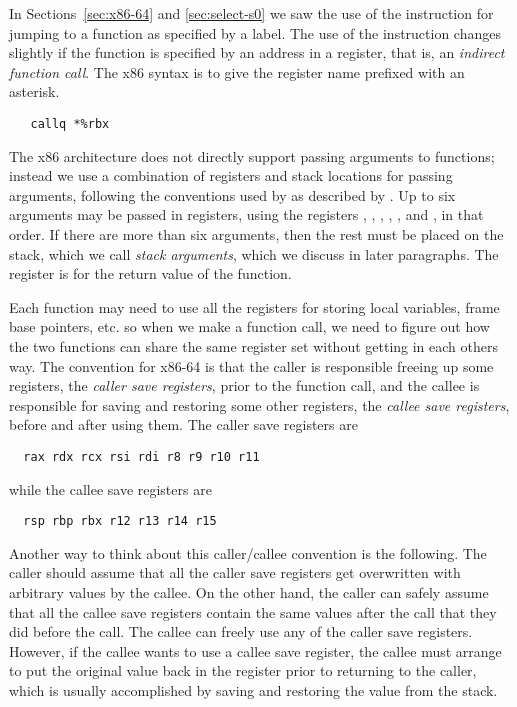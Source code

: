 \documentclass[11pt]{book}
\begin{document}
In Sections~\ref{sec:x86-64} and \ref{sec:select-s0} we saw the use of
the  instruction for jumping to a function as specified by
a label. The use of the instruction changes slightly if the function
is specified by an address in a register, that is, an \emph{indirect
  function call}. The x86 syntax is to give the register name prefixed
with an asterisk.
\begin{lstlisting}
   callq *%rbx
\end{lstlisting}

The x86 architecture does not directly support passing arguments to
functions; instead we use a combination of registers and stack
locations for passing arguments, following the conventions used by
 as described by \cite{Matz:2013aa}. Up to six arguments may
be passed in registers, using the registers , ,
, , , and , in that order.  If
there are more than six arguments, then the rest must be placed on the
stack, which we call \emph{stack arguments}, which we discuss in later
paragraphs. The register  is for the return value of the
function.

Each function may need to use all the registers for storing local
variables, frame base pointers, etc. so when we make a function call,
we need to figure out how the two functions can share the same
register set without getting in each others way. The convention for
x86-64 is that the caller is responsible freeing up some registers,
the \emph{caller save registers}, prior to the function call, and the
callee is responsible for saving and restoring some other registers,
the \emph{callee save registers}, before and after using them. The
caller save registers are
\begin{lstlisting}
  rax rdx rcx rsi rdi r8 r9 r10 r11
\end{lstlisting}
while the callee save registers are 
\begin{lstlisting}
  rsp rbp rbx r12 r13 r14 r15
\end{lstlisting}
Another way to think about this caller/callee convention is the
following. The caller should assume that all the caller save registers
get overwritten with arbitrary values by the callee.  On the other
hand, the caller can safely assume that all the callee save registers
contain the same values after the call that they did before the call.
The callee can freely use any of the caller save registers.  However,
if the callee wants to use a callee save register, the callee must
arrange to put the original value back in the register prior to
returning to the caller, which is usually accomplished by saving and
restoring the value from the stack.
\end{document}
